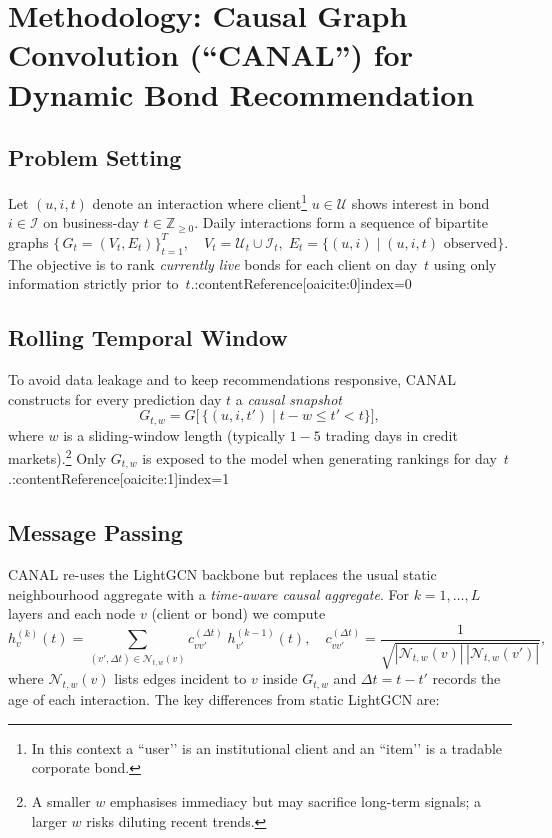 \documentclass{article}
\begin{document}
\section*{Methodology: Causal Graph Convolution (``CANAL'') for Dynamic Bond Recommendation}

\subsection*{Problem Setting}

Let $(u,i,t)$ denote an interaction where client\footnote{In this context a ``user’’ is an institutional client and an ``item’’ is a tradable corporate bond.} 
$u\in\mathcal U$ shows interest in bond $i\in\mathcal I$ on business-day $t\in\mathbb Z_{\ge 0}$.  
Daily interactions form a sequence of bipartite graphs
$
\{\,G_t=(V_t,E_t)\}_{t=1}^{T},\quad 
V_t=\mathcal U_t\cup\mathcal I_t,\;
E_t=\{(u,i)\mid(u,i,t)\text{ observed}\}.
$
The objective is to rank \emph{currently live} bonds for each client on day~$t$ using only information strictly prior to~$t$.:contentReference[oaicite:0]{index=0}

\subsection*{Rolling Temporal Window}

To avoid data leakage and to keep recommendations responsive, CANAL constructs for every
prediction day $t$ a \emph{causal snapshot}
\[
G_{t,w}=G\bigl[\,\{(u,i,t')\mid t-w\le t' < t\}\bigr],
\]
where $w$ is a sliding-window length (typically $1\!-\!5$ trading days in credit markets).\footnote{A smaller $w$ emphasises immediacy but may sacrifice long-term signals; a larger $w$ risks diluting recent trends.}  
Only $G_{t,w}$ is exposed to the model when generating rankings for day~$t$.:contentReference[oaicite:1]{index=1}

\subsection*{Message Passing}

CANAL re-uses the LightGCN backbone but replaces the usual static neighbourhood aggregate with a \emph{time-aware causal aggregate}.  
For $k=1,\dots,L$ layers and each node $v$ (client or bond) we compute
\[
h^{(k)}_v(t)=
    \sum_{(v',\Delta t)\in\mathcal N_{t,w}(v)}
    c^{(\Delta t)}_{vv'}\;h^{(k-1)}_{v'}(t),
\quad 
c^{(\Delta t)}_{vv'}=\frac{1}{\sqrt{|\mathcal N_{t,w}(v)|\,|\mathcal N_{t,w}(v')|}},
\]
where $\mathcal N_{t,w}(v)$ lists edges incident to $v$ inside $G_{t,w}$ and
$\Delta t=t-t'$ records the age of each interaction.  
The key differences from static LightGCN are:
\end{document}
